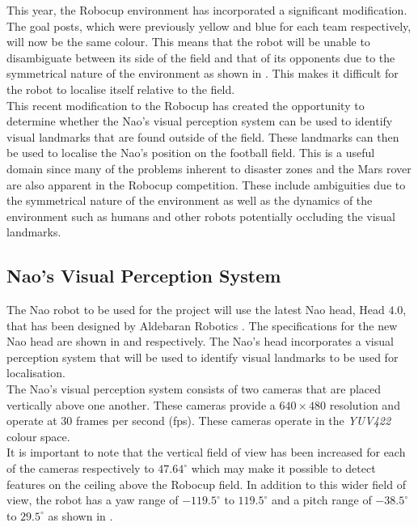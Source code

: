 This year, the Robocup environment has incorporated a significant modification. The goal posts, which were previously yellow and blue for each team respectively, will now be the same colour. This means that the robot will be unable to disambiguate between its side of the field and that of its opponents due to the symmetrical nature of the environment as shown in . This makes it difficult for the robot to localise itself relative to the field.\\

This recent modification to the Robocup has created the opportunity to determine whether the Nao's visual perception system can be used to identify visual landmarks that are found outside of the field. These landmarks can then be used to localise the Nao's position on the football field. This is a useful domain since many of the problems inherent to disaster zones and the Mars rover are also apparent in the Robocup competition. These include ambiguities due to the symmetrical nature of the environment as well as the dynamics of the environment such as humans and other robots potentially occluding the visual landmarks.\\

\subsection{Nao's Visual Perception System}
\label{sec:naoSpecs}
The Nao robot to be used for the project will use the latest Nao head, Head $4.0$, that has been designed by Aldebaran Robotics \citep{NaoHead}. The specifications for the new Nao head are shown in  and  respectively. The Nao's head incorporates a visual perception system that will be used to identify visual landmarks to be used for localisation.\\

The Nao's visual perception system consists of two cameras that are placed vertically above one another. These cameras provide a $640 \times 480$ resolution and operate at $30$ frames per second (fps). These cameras operate in the \textit{YUV422} colour space.\\

It is important to note that the vertical field of view has been increased for each of the cameras respectively to $47.64^\circ$ which may make it possible to detect features on the ceiling above the Robocup field. In addition to this wider field of view, the robot has a yaw range of $-119.5^\circ$ to $119.5^\circ$ and a pitch range of $-38.5^\circ$ to $29.5^\circ$ as shown in .\\ 

